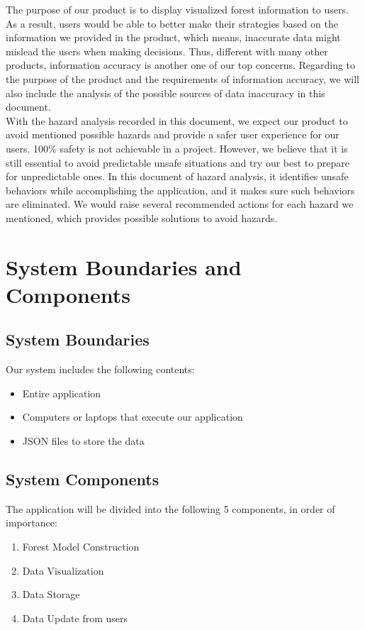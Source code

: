 \documentclass{article}
\begin{document}
\noindent The purpose of our product is to display visualized 
forest information to users. As a result, users would be able to 
better make their strategies based on the information we provided in
the product, which means, inaccurate data might mislead the users 
when making decisions. Thus, different with many other products, 
information accuracy is another one of our top concerns. Regarding 
to the purpose of the product and the requirements of
information accuracy, we will also include the analysis of the 
possible sources of data inaccuracy in this document. \\

\noindent With the hazard analysis recorded in this document, we 
expect our product to avoid mentioned possible hazards and provide a
safer user experience for our users. 100\% safety is not achievable
in a project. However, we believe that it is still essential to 
avoid predictable unsafe situations and try our best to prepare for
unpredictable ones. In this document of hazard analysis, it
identifies unsafe behaviors while accomplishing the application, and
it makes sure such behaviors are eliminated. We would raise several
recommended actions for each hazard we mentioned, which provides 
possible solutions to avoid hazards. 

\newpage

\section{System Boundaries and Components}
\subsection{System Boundaries}
Our system includes the following contents:
\begin{itemize}
    \item Entire application
    \item Computers or laptops that execute our application
    \item JSON files to store the data
\end{itemize}
\subsection{System Components}
The application will be divided into the following 5 components, in order of importance:
\begin{enumerate}
    \item Forest Model Construction
    \item Data Visualization
    \item Data Storage
    \item Data Update from users
\end{enumerate}
\end{document}

